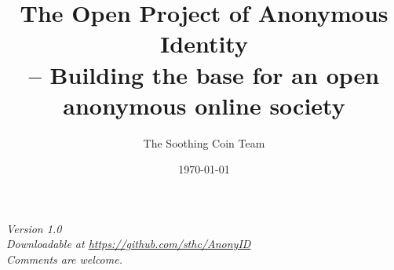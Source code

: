 \documentclass[12pt, a4paper]{article}
\begin{document}
\title{The Open Project of Anonymous Identity \\
       \large -- Building the base for an open anonymous online society
       }
\author {The Soothing Coin Team}

\date{\today}

\maketitle

\begin{center}
\textit{Version 1.0\\Downloadable at \href{https://github.com/sthc/AnonyID}{https://github.com/sthc/AnonyID}\\Comments are welcome.}
\end{center}
\end{document}
